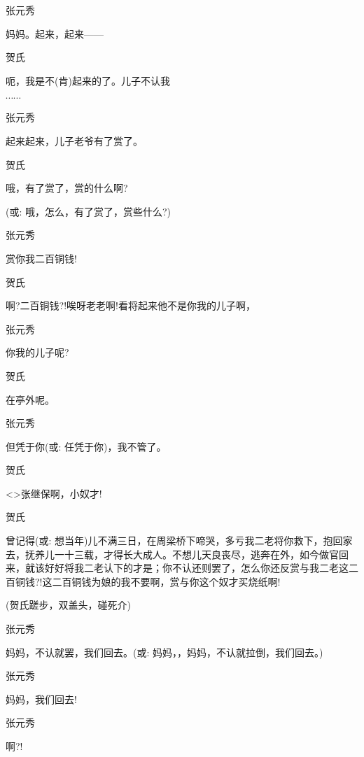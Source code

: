 {张元秀\hspace{20pt}~

妈妈。起来，起来------}

{贺氏\hspace{30pt}~

呃，我是不(肯)起来的了。儿子不认我}$\cdots{}\cdots{}$

{张元秀\hspace{20pt}~

起来起来，儿子老爷有了赏了。}

{贺氏

哦，有了赏了，赏的什么啊?}({\akai 或}: 哦，怎么，有了赏了，赏些什么?)

{张元秀\hspace{20pt}~

赏你我二百铜钱!}

{贺氏\hspace{30pt}~

啊?二百铜钱?!唉呀老老啊!看将起来他不是你我的儿子啊，}

{张元秀\hspace{20pt}~

你我的儿子呢?}

{贺氏\hspace{30pt}~

在亭外呢。}

{张元秀\hspace{20pt}~

但凭于你({\akai 或}: 任凭于你)，我不管了。}

{贺氏}

\textless{}\!\textgreater{}{张继保啊，小奴才!}

{贺氏

曾记得({\akai 或}: 想当年)儿不满三日，在周梁桥下啼哭，多亏我二老将你救下，抱回家去，抚养儿一十三载，才得长大成人。不想儿天良丧尽，逃奔在外，如今做官回来，就该好好将我二老认下的才是；你不认还则罢了，怎么你还反赏与我二老这二百铜钱?!这二百铜钱为娘的我不要啊，赏与你这个奴才买烧纸啊!}

{(贺氏蹉步，双盖头，碰死介)}

{张元秀

妈妈，不认就罢，我们回去。({\akai 或}: 妈妈，，妈妈，不认就拉倒，我们回去。)}

{张元秀\hspace{20pt}~

妈妈，我们回去!}

{张元秀\hspace{20pt}~

啊?!}

